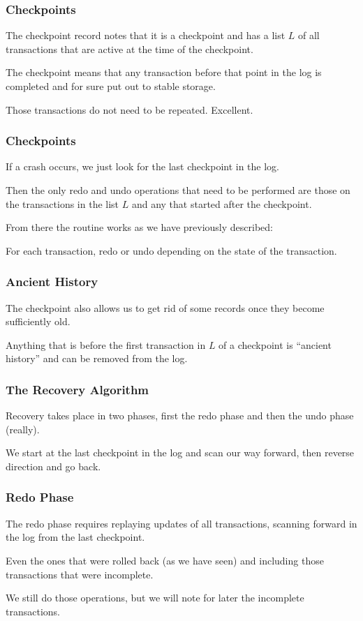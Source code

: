 \begin{frame}
\frametitle{Checkpoints}

The checkpoint record notes that it is a checkpoint and has a list $L$ of all transactions that are active at the time of the checkpoint. 

The checkpoint means that any transaction before that point in the log is completed and for sure put out to stable storage.

Those transactions do not need to be repeated. Excellent.

\end{frame}

\begin{frame}
\frametitle{Checkpoints}

If a crash occurs, we just look for the last checkpoint in the log. 

Then the only redo and undo operations that need to be performed are those on the transactions in the list $L$ and any that started after the checkpoint.

From there the routine works as we have previously described: 

For each transaction, redo or undo depending on the state of the transaction.
\end{frame}

\begin{frame}
\frametitle{Ancient History}

The checkpoint also allows us to get rid of some records once they become sufficiently old. 

Anything that is before the first transaction in $L$ of a checkpoint is ``ancient history'' and can be removed from the log.

\end{frame}

\begin{frame}
\frametitle{The Recovery Algorithm}

Recovery takes place in two phases, first the redo phase and then the undo phase (really). 

We start at the last checkpoint in the log and scan our way forward, then reverse direction and go back. 

\end{frame}


\begin{frame}
\frametitle{Redo Phase}

The \alert{redo phase} requires replaying updates of all transactions, scanning forward in the log from the last checkpoint. 

Even the ones that were rolled back (as we have seen) and including those transactions that were incomplete. 

We still do those operations, but we will note for later the incomplete transactions. 

\end{frame}

